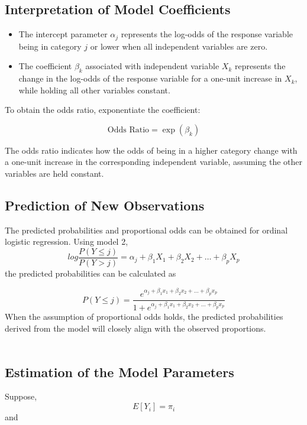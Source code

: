 \documentclass[12pt]{article}\usepackage[]{graphicx}\usepackage[]{xcolor}
\numberwithin{equation}{section}
\numberwithin{figure}{section}
\begin{document}
	\subsection{Interpretation of Model Coefficients}
	\begin{itemize}
		\item The intercept parameter $\alpha_j$ represents the log-odds of the response variable being in category $j$ or lower when all independent variables are zero.
		\item The coefficient $\beta_k$ associated with independent variable $X_k$ represents the change in the log-odds of the response variable for a one-unit increase in $X_k$, while holding all other variables constant.
	\end{itemize}
	
\noindent To obtain the odds ratio, exponentiate the coefficient:
	
	\[
	\text{Odds Ratio} = \exp(\beta_k)
	\]
	
\noindent The odds ratio indicates how the odds of being in a higher category change with a one-unit increase in the corresponding independent variable, assuming the other variables are held constant.\\

	\subsection{Prediction of New Observations}
The predicted probabilities  and proportional odds can be obtained for ordinal logistic regression.
Using model 2,
				\begin{equation}
			log \frac{P(Y\le j)}{P(Y>j)} = \alpha_j + \beta_1 X_1 + \beta_2 X_2 + \ldots + \beta_p X_p
		\label{eq:3.5}
\end{equation}
	the predicted probabilities can be calculated as 
	
	
	
	
\begin{equation}
P(Y\le j)=\frac{e^{\alpha_j+\beta_1x_1+\beta_2x_2+\ldots+\beta_p x_p}}{1+e^{\alpha_j+\beta_1x_1+\beta_2x_2+\ldots+\beta_p x_p}}
			\label{eq:3.6}
\end{equation}	
When the assumption of proportional odds holds, the predicted probabilities derived from the model will closely align with the observed proportions.\\~\\


\subsection{Estimation of the Model Parameters}
Suppose,
\begin{equation}
 E[Y_i] = \pi_i
\label{eq:3.7}
	\end{equation}
and
\end{document}
